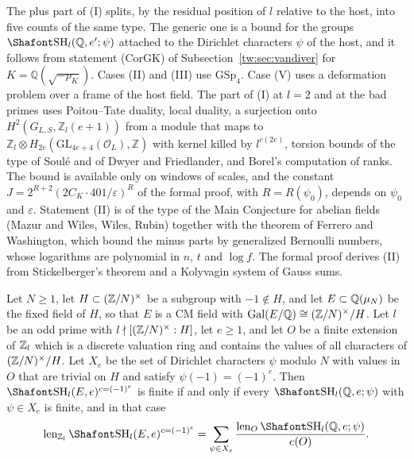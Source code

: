  The plus part of (I) splits, by the residual position of $l$ relative to the host, into five counts of the same type. The generic one is a bound for the groups $\Sha_l(\mathbb Q,e';\psi)$ attached to the Dirichlet characters $\psi$ of the host, and it follows from statement (CorGK) of Subsection~\ref{tw:sec:vandiver} for $K=\mathbb Q(\sqrt{-p_K})$. Cases (II) and (III) use $\mathrm{GSp}_4$. Case (V) uses a deformation problem over a frame of the host field. The part of (I) at $l=2$ and at the bad primes uses Poitou--Tate duality, local duality, a surjection onto $H^2(G_{L,S},\mathbb Z_l(e+1))$ from a module that maps to $\mathbb Z_l\otimes H_{2e}(\mathrm{GL}_{4e+4}(\mathcal O_L),\mathbb Z)$ with kernel killed by $l^{c(2e)}$, torsion bounds of the type of Soul\'e and of Dwyer and Friedlander, and Borel's computation of ranks. The bound is available only on windows of scales, and the constant $J=2^{R+2}(2C_K\cdot401/\varepsilon)^R$ of the formal proof, with $R=R(\psi_0)$, depends on $\psi_0$ and $\varepsilon$. Statement (II) is of the type of the Main Conjecture for abelian fields (Mazur and Wiles, Wiles, Rubin) together with the theorem of Ferrero and Washington, which bound the minus parts by generalized Bernoulli numbers, whose logarithms are polynomial in $n$, $t$ and $\log f$. The formal proof derives (II) from Stickelberger's theorem and a Kolyvagin system of Gauss sums.

\begin{proposition}\label{w4:prop:pluschar}
Let $N\ge1$, let $H\subset(\mathbb Z/N)^\times$ be a subgroup with $-1\notin H$, and let $E\subset\mathbb Q(\mu_N)$ be the fixed field of $H$, so that $E$ is a CM field with $\operatorname{Gal}(E/\mathbb Q)\cong(\mathbb Z/N)^\times/H$. Let $l$ be an odd prime with $l\nmid[(\mathbb Z/N)^\times:H]$, let $e\ge1$, and let $O$ be a finite extension of $\mathbb Z_l$ which is a discrete valuation ring and contains the values of all characters of $(\mathbb Z/N)^\times/H$. Let $X_e$ be the set of Dirichlet characters $\psi$ modulo $N$ with values in $O$ that are trivial on $H$ and satisfy $\psi(-1)=(-1)^e$. Then $\Sha_l(E,e)^{c=(-1)^e}$ is finite if and only if every $\Sha_l(\Q,e;\psi)$ with $\psi\in X_e$ is finite, and in that case
\[
\len_{\Zl}\Sha_l(E,e)^{c=(-1)^e}=\sum_{\psi\in X_e}\frac{\len_O\Sha_l(\Q,e;\psi)}{e(O)} .
\]
\end{proposition}

